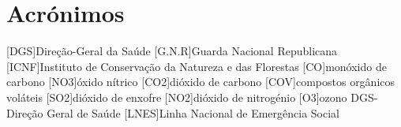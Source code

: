 \documentclass{report}
\begin{document}

\chapter*{Acrónimos}

\begin{acronym}
 [DGS]{Direção-Geral da Saúde}
 [G.N.R]{Guarda Nacional Republicana}
 [ICNF]{Instituto de Conservação da Natureza e das Florestas}
 [CO]{monóxido de carbono}
 [NO3]{óxido nítrico}
 [CO2]{dióxido de carbono}
 [COV]{compostos orgânicos voláteis}
 [SO2]{dióxido de enxofre}
 [NO2]{dióxido de nitrogénio}
 [O3]{ozono DGS- Direção Geral de Saúde}
 [LNES]{Linha Nacional de Emergência Social}
\end{acronym}
 


\printbibliography
\end{document}
